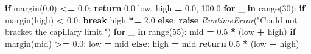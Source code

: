 \documentclass[
  12pt,a4paper,oneside]{report}
\newenvironment{Shaded}{\begin{snugshade}}{\end{snugshade}}
\newcommand{\BuiltInTok}[1]{#1}
\newcommand{\ControlFlowTok}[1]{\textcolor[rgb]{0.13,0.29,0.53}{\textbf{#1}}}
\newcommand{\DecValTok}[1]{\textcolor[rgb]{0.00,0.00,0.81}{#1}}
\newcommand{\FloatTok}[1]{\textcolor[rgb]{0.00,0.00,0.81}{#1}}
\newcommand{\KeywordTok}[1]{\textcolor[rgb]{0.13,0.29,0.53}{\textbf{#1}}}
\newcommand{\NormalTok}[1]{#1}
\newcommand{\OperatorTok}[1]{\textcolor[rgb]{0.81,0.36,0.00}{\textbf{#1}}}
\newcommand{\PreprocessorTok}[1]{\textcolor[rgb]{0.56,0.35,0.01}{\textit{#1}}}
\newcommand{\StringTok}[1]{\textcolor[rgb]{0.31,0.60,0.02}{#1}}
\begin{document}
\begin{Shaded}
\begin{Highlighting}[]
    \ControlFlowTok{if}\NormalTok{ margin(}\FloatTok{0.0}\NormalTok{) }\OperatorTok{\textless{}=} \FloatTok{0.0}\NormalTok{:}
        \ControlFlowTok{return} \FloatTok{0.0}
\NormalTok{    low, high }\OperatorTok{=} \FloatTok{0.0}\NormalTok{, }\FloatTok{100.0}
    \ControlFlowTok{for}\NormalTok{ \_ }\KeywordTok{in} \BuiltInTok{range}\NormalTok{(}\DecValTok{30}\NormalTok{):}
        \ControlFlowTok{if}\NormalTok{ margin(high) }\OperatorTok{\textless{}} \FloatTok{0.0}\NormalTok{:}
            \ControlFlowTok{break}
\NormalTok{        high }\OperatorTok{*=} \FloatTok{2.0}
    \ControlFlowTok{else}\NormalTok{:}
        \ControlFlowTok{raise} \PreprocessorTok{RuntimeError}\NormalTok{(}\StringTok{"Could not bracket the capillary limit."}\NormalTok{)}
    \ControlFlowTok{for}\NormalTok{ \_ }\KeywordTok{in} \BuiltInTok{range}\NormalTok{(}\DecValTok{55}\NormalTok{):}
\NormalTok{        mid }\OperatorTok{=} \FloatTok{0.5} \OperatorTok{*}\NormalTok{ (low }\OperatorTok{+}\NormalTok{ high)}
        \ControlFlowTok{if}\NormalTok{ margin(mid) }\OperatorTok{\textgreater{}=} \FloatTok{0.0}\NormalTok{:}
\NormalTok{            low }\OperatorTok{=}\NormalTok{ mid}
        \ControlFlowTok{else}\NormalTok{:}
\NormalTok{            high }\OperatorTok{=}\NormalTok{ mid}
    \ControlFlowTok{return} \FloatTok{0.5} \OperatorTok{*}\NormalTok{ (low }\OperatorTok{+}\NormalTok{ high)}



\end{Highlighting}
\end{Shaded}
\end{document}
